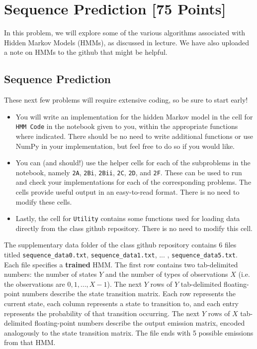 \begin{solution}
\end{solution}


\newpage
\section{Sequence Prediction [75 Points]}

In this problem, we will explore some of the various algorithms associated with Hidden Markov Models (HMMs), as discussed in lecture.
We have also uploaded a note on HMMs to the github that might be helpful.

\subsection{Sequence Prediction}

These next few problems will require extensive coding, so be sure to start early! 
\begin{itemize}
  \item You will write an implementation for the hidden Markov model in the cell for \texttt{HMM Code} in the notebook given to you, within the appropriate functions where indicated. There should be no need to write additional functions or use NumPy in your implementation, but feel free to do so if you would like.
  \item You can (and should!) use the helper cells for each of the subproblems in the notebook, namely \texttt{2A}, \texttt{2Bi}, \texttt{2Bii}, \texttt{2C}, \texttt{2D}, and \texttt{2F}. These can be used to run and check your implementations for each of the corresponding problems. The cells provide useful output in an easy-to-read format. There is no need to modify these cells.
  \item Lastly, the cell for \texttt{Utility} contains some functions used for loading data directly from the class github repository. There is no need to modify this cell. \\
\end{itemize}

The supplementary data folder of the class github repository contains 6 files titled \texttt{sequence_data0.txt}, \texttt{sequence_data1.txt}, ... , \texttt{sequence_data5.txt}. Each file specifies a \textbf{trained} HMM. The first row contains two tab-delimited numbers: the number of states $Y$ and the number of types of observations $X$ (i.e. the observations are $0, 1, . . . , X - 1$). The next $Y$ rows of $Y$ tab-delimited floating-point numbers describe the state transition matrix. Each row represents the current state, each column represents a state to transition to, and each entry represents the probability of that transition occurring. The next $Y$ rows of $X$ tab-delimited floating-point numbers describe the output emission matrix, encoded analogously to the state transition matrix. The file ends with 5 possible emissions from that HMM. \\

